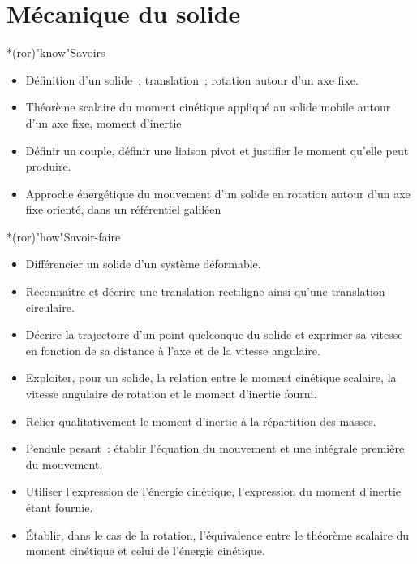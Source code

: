 \documentclass[../../main/main.tex]{subfiles}
\begin{document}
\setcounter{chapter}{7}


\chapter{M\'ecanique du solide}

\vspace*{\fill}

\begin{prgm}
	\footnotesize
	\begin{tcb}*(ror)"know"{Savoirs}
		\begin{itemize}
			\item Définition d'un solide~; translation~; rotation autour d'un axe
			      fixe.
			\item Théorème scalaire du moment cinétique appliqué au solide mobile
			      autour d'un axe fixe, moment d'inertie
			\item Définir un couple, définir une liaison pivot et justifier le moment
			      qu'elle peut produire.
			\item Approche énergétique du mouvement d'un solide en rotation autour
			      d'un axe fixe orienté, dans un référentiel galiléen
		\end{itemize}
	\end{tcb}
	\begin{tcb}*(ror)"how"{Savoir-faire}
		\begin{itemize}
			\item Différencier un solide d'un système déformable.
			\item Reconnaître et décrire une translation rectiligne ainsi qu'une
			      translation circulaire.
			\item Décrire la trajectoire d'un point quelconque du solide et exprimer
			      sa vitesse en fonction de sa distance à l'axe et de la vitesse
			      angulaire.
			\item Exploiter, pour un solide, la relation entre le moment cinétique
			      scalaire, la vitesse angulaire de rotation et le moment d'inertie
			      fourni.
			\item Relier qualitativement le moment d'inertie à la répartition des
			      masses.
			\item Pendule pesant~: établir l'équation du mouvement et une intégrale
			      première du mouvement.
			\item Utiliser l'expression de l'énergie cinétique, l'expression du moment
			      d'inertie étant fournie.
			\item Établir, dans le cas de la rotation, l'équivalence entre le théorème
			      scalaire du moment cinétique et celui de l'énergie cinétique.
		\end{itemize}
	\end{tcb}
\end{prgm}
\end{document}
